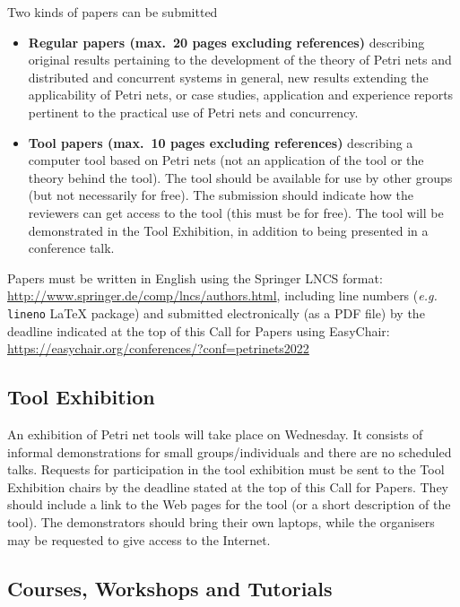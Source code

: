 \documentclass[10pt,a4paper]{article}
\begin{document}
Two kinds of papers can be submitted
\begin{itemize}
\item {\bf Regular papers (max.\ 20 pages excluding references)} describing original results pertaining
to the development of the theory of Petri nets and distributed and concurrent systems in
general, new results extending the applicability of Petri nets, or case studies, application
and experience reports pertinent to the practical use of Petri nets and concurrency.
\item {\bf Tool papers (max.\ 10 pages excluding references)} describing a computer tool based on Petri
nets (not an application of the tool or the theory behind the tool). The tool should
be available for use by other groups (but not necessarily for free). The submission
should indicate how the reviewers can get access to the tool (this must be for free).
The tool will be demonstrated in the Tool Exhibition, in addition to being presented
in a conference talk.
\end{itemize}

\noindent Papers must be written in English using the Springer LNCS format: \url{http://www.springer.de/comp/lncs/authors.html},
including line numbers (\emph{e.g.} \texttt{lineno} \LaTeX{} package)
and submitted electronically (as a PDF file) by the deadline indicated at the top
of this Call for Papers using EasyChair:
%
	\url{https://easychair.org/conferences/?conf=petrinets2022}

\subsection*{Tool Exhibition}

An exhibition of Petri net tools will take place on Wednesday. It consists of informal
demonstrations for small groups/individuals and there are no scheduled talks. Requests
for participation in the tool exhibition must be sent to the Tool Exhibition chairs
by the deadline stated at the top of this Call for Papers. They should include a link
to the Web pages for the tool (or a short description of the tool). The demonstrators
should bring their own laptops, while the organisers may be requested to give access
to the Internet.

\subsection*{Courses, Workshops and Tutorials}
\end{document}
